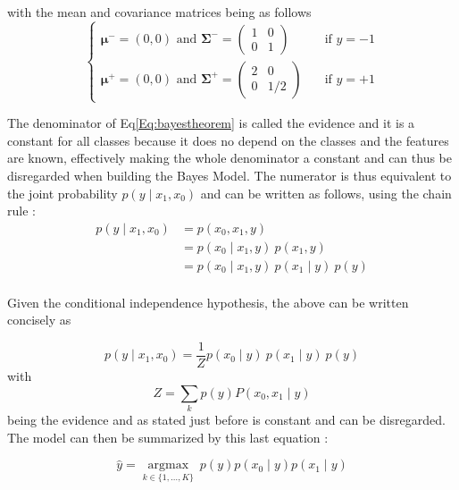 \documentclass{article}
\begin{document}
\noindent with the mean and covariance matrices being as follows
\[   
     \begin{cases}
        \boldsymbol{\mu^-} = (0,0) \text{ and }
        \boldsymbol{\Sigma^-} =
       \begin{pmatrix} 
            1 & 0 \\
            0 & 1
        \end{pmatrix} 
        &\quad\text{if }  y = - 1\\
        \boldsymbol{\mu^+} = (0,0) \text{ and }
        \boldsymbol{\Sigma^+} =
       \begin{pmatrix} 
            2 & 0 \\
            0 & 1/2
        \end{pmatrix} 
         &\quad\text{if }  y = + 1
     \end{cases}
\]


\noindent 
The denominator of Eq\ref{Eq:bayestheorem} is called the evidence and it is a constant for all classes because it does no depend on the classes and the features are known, effectively making the whole denominator a constant and can thus be disregarded when building the Bayes Model.
The numerator is thus equivalent to the joint probability $p(y \mid x_{1}, x_{0})$ and can be written as follows, using the chain rule :
\begin{equation}
 \begin{aligned}
 p(y \mid x_{1}, x_{0})
 &=p(x_{0} ,x_{1},y)\\
 &=p(x_{0}\mid x_{1}, y)\ p(x_{1},y)\\
 &=p(x_{0}\mid x_{1}, y)\ p(x_{1} \mid y)\ p(y)\\
 \end{aligned}
\end{equation}

\noindent Given the conditional independence hypothesis, the above can be written concisely as

\begin{equation*}
p(y \mid x_{1}, x_{0}) = \frac{1}{Z}p(x_0 \mid y)\ p(x_1 \mid y)\ p(y)
\end{equation*}
\noindent 
with 
\begin{equation*}
Z = \sum_{k} p(y) P(x_0,x_1 \mid y)
\end{equation*}
being the evidence and as stated just before is constant and can be disregarded. The model can then be summarized by this last equation :

\begin{equation}
    \hat {y}={\underset {k\in \{1,\dots ,K\}}{\operatorname {argmax} }}\ p(y)p(x_0 \mid y)p(x_1 \mid y)
    \label{Eq:bayesmodel}
\end{equation}
\end{document}
